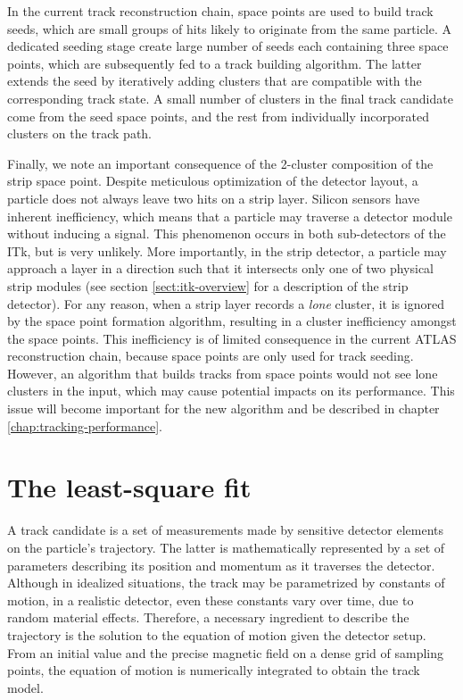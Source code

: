 
In the current track reconstruction chain, space points are used to build track seeds, which are small groups of hits likely to originate from the same particle. 
A dedicated seeding stage create large number of seeds each containing three space points, which are subsequently fed to a track building algorithm. 
The latter extends the seed by iteratively adding clusters that are compatible with the corresponding track state.
A small number of clusters in the final track candidate come from the seed space points, and the rest from individually incorporated clusters on the track path.

Finally, we note an important consequence of the 2-cluster composition of the strip space point.
Despite meticulous optimization of the detector layout, a particle does not always leave two hits on a strip layer. 
Silicon sensors have inherent inefficiency, which means that a particle may traverse a detector module without inducing a signal.
This phenomenon occurs in both sub-detectors of the ITk, but is very unlikely.
More importantly, in the strip detector, a particle may approach a layer in a direction such that it intersects only one of two physical strip modules (see section \ref{sect:itk-overview} for a description of the strip detector). 
For any reason, when a strip layer records a \textit{lone} cluster, it is ignored by the space point formation algorithm, resulting in a cluster inefficiency amongst the space points.
This inefficiency is of limited consequence in the current ATLAS reconstruction chain, because space points are only used for track seeding.
However, an algorithm that builds tracks from space points would not see lone clusters in the input, which may cause potential impacts on its performance.
This issue will become important for the new algorithm and be described in chapter \ref{chap:tracking-performance}.

\section{The least-square fit}
\label{sect:track-fit}

A track candidate is a set of measurements made by sensitive detector elements on the particle's trajectory. 
The latter is mathematically represented by a set of parameters describing its position and momentum as it traverses the detector. 
Although in idealized situations, the track may be parametrized by constants of motion, in a realistic detector, even these constants vary over time, due to random material effects. 
Therefore, a necessary ingredient to describe the trajectory is the solution to the equation of motion given the detector setup. 
From an initial value and the precise magnetic field on a dense grid of sampling points, the equation of motion is numerically integrated to obtain the track model. 

